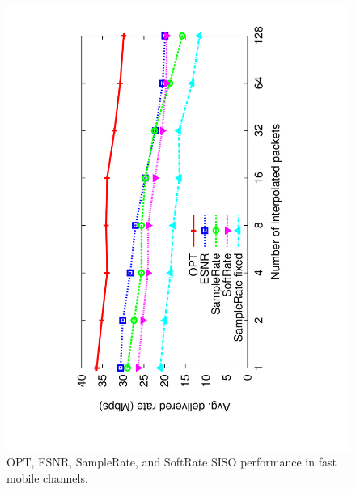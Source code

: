 \begin{figure}[t]
      \centering
      \includegraphics[angle=-90,viewport=120 68 491 760,clip,width=0.95\columnwidth]{figures/esnr/siso_rate_skip_opt_eff_sr_so.pdf}
      \vspace{-2pt}
      \caption{\label{fig:siso_rate_skip_opt_eff_sr_so} OPT, ESNR, SampleRate, and SoftRate SISO performance in fast mobile channels.}
      \vspace{-2pt}
\end{figure}


